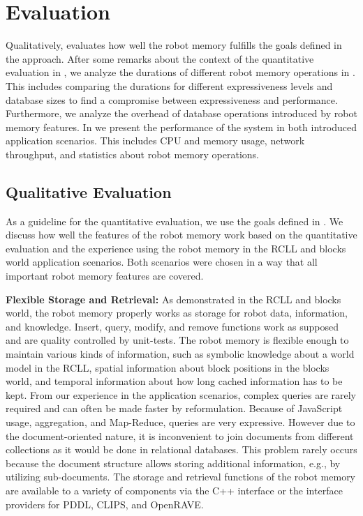 \chapter{Evaluation}
\label{chap:evaluation}
Qualitatively,  evaluates
how well the robot memory fulfills the goals defined in the approach.
After some remarks about the context of the quantitative evaluation in , we
analyze the durations of different robot memory operations in
. This includes comparing the durations for
different expressiveness levels and database sizes to find a
compromise between expressiveness and performance. Furthermore, we
analyze the overhead of database operations introduced by robot memory
features. In  we present the performance of
the system in both introduced application scenarios. This includes CPU
and memory usage, network throughput, and statistics about robot
memory operations.

\section{Qualitative Evaluation}
\label{sec:qualitative}
As a guideline for the quantitative evaluation, we use the goals defined
in . We discuss how well the
features of the robot memory work based on the quantitative evaluation
and the experience using the robot memory in the RCLL and
blocks world application scenarios. Both scenarios were chosen in a
way that all important robot memory features are covered.

\textbf{Flexible Storage and Retrieval:}
As demonstrated in the RCLL and blocks world, the robot memory
properly works as storage for robot data, information,
and knowledge. Insert, query, modify, and remove functions work as
supposed and are quality controlled by unit-tests. The robot memory is flexible
enough to maintain various kinds of information, such as symbolic knowledge
about a world model in the RCLL, spatial information about block
positions in the blocks world, and temporal information about how long
cached information has to be kept.
From our experience in the application scenarios, complex
queries are rarely required and can often be made faster by
reformulation.  Because of JavaScript usage, aggregation, and
Map-Reduce, queries are very expressive.
However due to the document-oriented nature, it is
inconvenient to join documents from different collections as it would
be done in relational databases. This problem rarely occurs because
the document structure allows
storing additional information, e.g., by utilizing sub-documents.
The storage and retrieval functions of the robot memory are available
to a variety of components via the C++ interface or the interface
providers for PDDL, CLIPS, and OpenRAVE.

